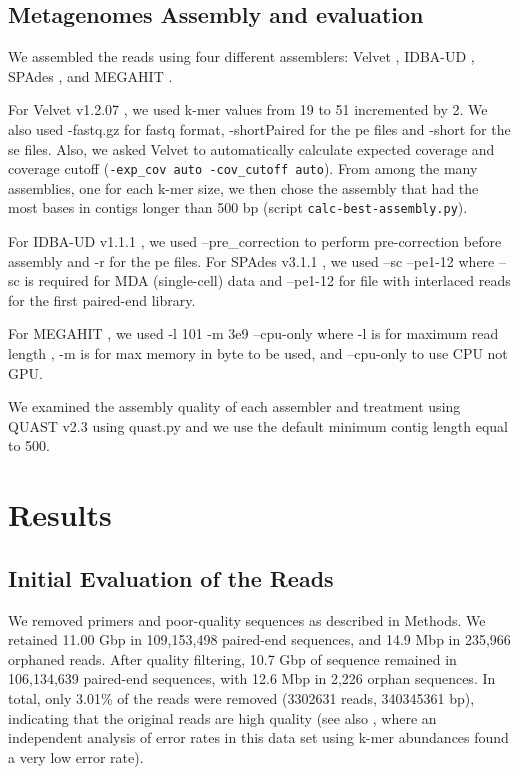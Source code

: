 \subsection*{Metagenomes Assembly and evaluation}

We assembled the reads using four different assemblers: Velvet \cite{velvet}, IDBA-UD \cite{idba}, SPAdes \cite{spades}, and MEGAHIT \cite{megahit}.

For Velvet v1.2.07  \cite{ velvet}, we used k-mer values from 19 to 51
incremented by 2. We also used -fastq.gz for fastq format,
-shortPaired for the pe files and -short for the se files. Also, we
asked Velvet to automatically calculate expected coverage and coverage
cutoff ({\tt -exp\_cov auto -cov\_cutoff auto}).
From among the many assemblies, one for each k-mer size,
we then chose the assembly that had the most bases in contigs longer than
500 bp (script {\tt calc-best-assembly.py}).

For IDBA-UD v1.1.1 \cite{idba},  we used  --pre\_correction to perform pre-correction before assembly and -r for the pe files. 
For SPAdes v3.1.1 \cite{spades}, we used --sc --pe1-12   where --sc is required for MDA (single-cell) data  and --pe1-12  for file with interlaced reads for the first paired-end library.%

For MEGAHIT \cite{megahit}, we used -l 101 -m 3e9 --cpu-only where -l is for maximum read length , -m is for max memory in byte to be used, and --cpu-only to use CPU not GPU.


We examined the assembly quality of each assembler and treatment using
QUAST v2.3 \cite{quast} using quast.py and we use the default minimum
contig length equal to 500.


\section*{Results}

\subsection*{Initial Evaluation of the Reads}

We removed primers and poor-quality sequences as described in Methods.
We retained 11.00 Gbp in 109,153,498 paired-end sequences, and 14.9
Mbp in 235,966 orphaned reads.  After quality filtering, 10.7 Gbp of
sequence remained in 106,134,639 paired-end sequences, with 12.6 Mbp
in 2,226 orphan sequences.  In total, only 3.01\% of the reads were
removed (3302631 reads, 340345361 bp), indicating that the original
reads are high quality (see also \cite{streaming}, where an
independent analysis of error rates in this data set using k-mer
abundances found a very low error rate).

